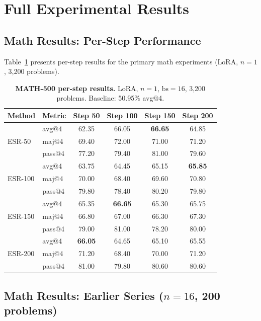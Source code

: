 \documentclass{article}
\begin{document}
\section{Full Experimental Results}
\label{app:full_results}

\subsection{Math Results: Per-Step Performance}

Table~\ref{tab:app_math_main} presents per-step results for the primary math experiments (LoRA, $n{=}1$, 3,200 problems).

\begin{table}[!htbp]
\centering
\caption{\textbf{MATH-500 per-step results.} LoRA, $n{=}1$, $\text{bs}{=}16$, 3,200 problems. Baseline: 50.95\% avg@4.}
\label{tab:app_math_main}
\small
\begin{tabular}{ll cccc}
\toprule
\textbf{Method} & \textbf{Metric} & \textbf{Step 50} & \textbf{Step 100} & \textbf{Step 150} & \textbf{Step 200} \\
\midrule
\multirow{3}{*}{ESR-50} & avg@4 & 62.35 & 66.05 & \textbf{66.65} & 64.85 \\
 & maj@4 & 69.40 & 72.00 & 71.00 & 71.20 \\
 & pass@4 & 77.20 & 79.40 & 81.00 & 79.60 \\
\midrule
\multirow{3}{*}{ESR-100} & avg@4 & 63.75 & 64.45 & 65.15 & \textbf{65.85} \\
 & maj@4 & 70.00 & 68.40 & 69.60 & 70.80 \\
 & pass@4 & 79.80 & 78.40 & 80.20 & 79.80 \\
\midrule
\multirow{3}{*}{ESR-150} & avg@4 & 65.35 & \textbf{66.65} & 65.30 & 65.75 \\
 & maj@4 & 66.80 & 67.00 & 66.30 & 67.30 \\
 & pass@4 & 79.00 & 81.00 & 78.20 & 80.00 \\
\midrule
\multirow{3}{*}{ESR-200} & avg@4 & \textbf{66.05} & 64.65 & 65.10 & 65.55 \\
 & maj@4 & 71.20 & 68.40 & 70.00 & 71.20 \\
 & pass@4 & 81.00 & 79.80 & 80.60 & 80.60 \\
\bottomrule
\end{tabular}
\end{table}


\subsection{Math Results: Earlier Series ($n{=}16$, 200 problems)}
\end{document}
